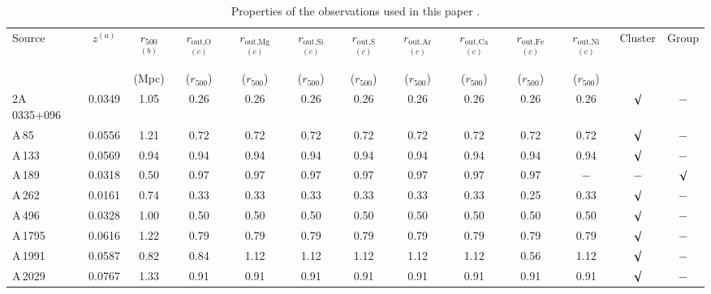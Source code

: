 \documentclass{aa}
\begin{document}
\begin{table}[!]
\begin{centering}
\setlength{\tabcolsep}{2.5pt}
\caption{Properties of the observations used in this paper \citep[see][for further details]{2016A&A...592A.157M}.} 
\label{table:observations_radii}
\begin{tabular}{l c c c c c c c c c c c c}        
\hline \hline
Source   & $z$$^{(a)}$ & $r_{500}$$^{(b)}$ & $r_\text{out,O}$$^{(c)}$  & $r_\text{out,Mg}$$^{(c)}$  & $r_\text{out,Si}$$^{(c)}$  & $r_\text{out,S}$$^{(c)}$  & $r_\text{out,Ar}$$^{(c)}$  & $r_\text{out,Ca}$$^{(c)}$ & $r_\text{out,Fe}$$^{(c)}$ & $r_\text{out,Ni}$$^{(c)}$ & Cluster & Group\\
  &  & & & & & & &  &  & & & \\
   &  & (Mpc) & ($r_{500}$) & ($r_{500}$) & ($r_{500}$) & ($r_{500}$) & ($r_{500}$) & ($r_{500}$) & ($r_{500}$) & ($r_{500}$) &  & \\

\hline 

2A 0335+096 &     0.0349 & 1.05 & 0.26 & 0.26 & 0.26 & 0.26 & 0.26 & 0.26 & 0.26 & 0.26 & $\surd$ & $-$ \\ 

A\,85 &     0.0556 & 1.21 & 0.72 & 0.72 & 0.72 & 0.72 & 0.72 & 0.72 & 0.72 & 0.72 & $\surd$ & $-$ \\ 

A\,133 &     0.0569  & 0.94 & 0.94 & 0.94 & 0.94 & 0.94 & 0.94 & 0.94 & 0.94 & 0.94 & $\surd$ & $-$ \\ 

A\,189 &     0.0318 & 0.50 & 0.97 & 0.97 & 0.97 & 0.97 & 0.97 & 0.97 & 0.97 & $-$ & $-$ & $\surd$ \\ 

A\,262 &     0.0161 &  0.74 & 0.33 & 0.33 & 0.33 & 0.33 & 0.33 & 0.33 & 0.25 & 0.33 & $\surd$ & $-$ \\ 

A\,496 &     0.0328 & 1.00 & 0.50 & 0.50 & 0.50 & 0.50 & 0.50 & 0.50 & 0.50 & 0.50 & $\surd$ & $-$ \\ 

A\,1795 &     0.0616 & 1.22 & 0.79 & 0.79 & 0.79 & 0.79 & 0.79 & 0.79 & 0.79 & 0.79 & $\surd$ & $-$ \\

A\,1991 &     0.0587 & 0.82 & 0.84 & 1.12 & 1.12 & 1.12 & 1.12 & 1.12 & 0.56 & 1.12 & $\surd$ & $-$ \\

A\,2029 &     0.0767 & 1.33 & 0.91 & 0.91 & 0.91 & 0.91 & 0.91 & 0.91 & 0.91 & 0.91 & $\surd$ & $-$ \\


\end{tabular}
\end{centering}
\end{table}
\end{document}
